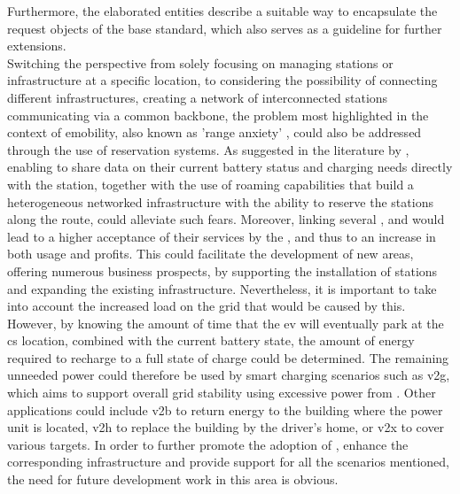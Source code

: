 Furthermore, the elaborated entities describe a suitable way to encapsulate the request objects of the base standard, which also serves as a guideline for further extensions. \\
\noindent Switching the perspective from solely focusing on managing stations or infrastructure at a specific location, to considering the possibility of connecting different infrastructures, creating a network of interconnected stations communicating via a common backbone, the problem most highlighted in the context of \acrshort{emobility}, also known as 'range anxiety' \cite{rauh_understanding_2015}, could also be addressed through the use of reservation systems.
As suggested in the literature by \cite{zarkeshev_charging_2018}, enabling  to share data on their current battery status and charging needs directly with the station, together with the use of roaming capabilities that build a heterogeneous networked infrastructure with the ability to reserve the stations along the route, could alleviate such fears.
Moreover, linking several ,  and  would lead to a higher acceptance of their services by the , and thus to an increase in both usage and profits.
This could facilitate the development of new areas, offering numerous business prospects, by supporting the installation of stations and expanding the existing infrastructure.
Nevertheless, it is important to take into account the increased load on the grid that would be caused by this. However, by knowing the amount of time that the \acrshort{ev} will eventually park at the \acrshort{cs} location, combined with the current battery state, the amount of energy required to recharge to a full state of charge could be determined.
The remaining unneeded power could therefore be used by smart charging scenarios such as \acrshort{v2g}, which aims to support overall grid stability using excessive power from .
Other applications could include \acrshort{v2b} to return energy to the building where the power unit is located, \acrshort{v2h} to replace the building by the driver's home, or \acrshort{v2x} to cover various targets.
In order to further promote the adoption of , enhance the corresponding infrastructure and provide support for all the scenarios mentioned, the need for future development work in this area is obvious. \\
